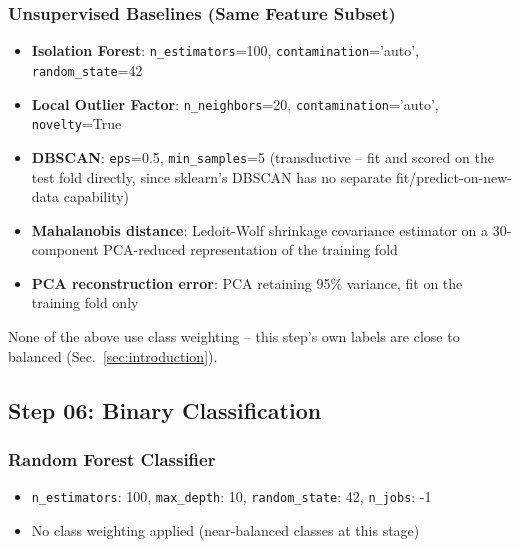 \subsubsection{Unsupervised Baselines (Same Feature Subset)}
\begin{itemize}
    \item \textbf{Isolation Forest}: \texttt{n\_estimators}=100, \texttt{contamination}='auto', \texttt{random\_state}=42  %
    \item \textbf{Local Outlier Factor}: \texttt{n\_neighbors}=20, \texttt{contamination}='auto', \texttt{novelty}=True  %
    \item \textbf{DBSCAN}: \texttt{eps}=0.5, \texttt{min\_samples}=5 (transductive -- fit and scored on the test fold directly, since sklearn's DBSCAN has no separate fit/predict-on-new-data capability)  %
    \item \textbf{Mahalanobis distance}: Ledoit-Wolf shrinkage covariance estimator on a 30-component PCA-reduced representation of the training fold  %
    \item \textbf{PCA reconstruction error}: PCA retaining 95\% variance, fit on the training fold only  %
\end{itemize}

None of the above use class weighting -- this step's own labels are close to balanced (Sec.~\ref{sec:introduction}).

\subsection{Step 06: Binary Classification}  %

\subsubsection{Random Forest Classifier}
\begin{itemize}
    \item \texttt{n\_estimators}: 100, \texttt{max\_depth}: 10, \texttt{random\_state}: 42, \texttt{n\_jobs}: -1  %
    \item No class weighting applied (near-balanced classes at this stage)
\end{itemize}

